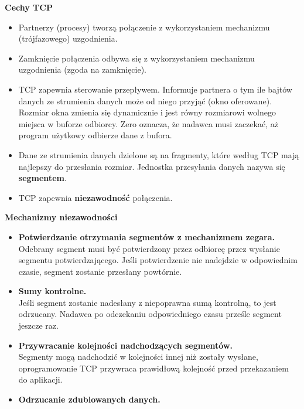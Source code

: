 \documentclass[../main.tex]{subfiles}
\begin{document}
    \textbf{Cechy TCP}
    \begin{itemize}
        \item Partnerzy (procesy) tworzą połączenie z wykorzystaniem mechanizmu (trójfazowego) uzgodnienia.
        \item Zamknięcie połączenia odbywa się z wykorzystaniem mechanizmu uzgodnienia (zgoda na zamknięcie).
        \item TCP zapewnia sterowanie przepływem. Informuje partnera o tym ile bajtów danych ze strumienia danych może od niego przyjąć (okno oferowane). Rozmiar okna zmienia się dynamicznie i jest równy rozmiarowi wolnego miejsca w buforze odbiorcy. Zero oznacza, że nadawca musi zaczekać, aż program użytkowy
        odbierze dane z bufora.
        \item Dane ze strumienia danych dzielone są na fragmenty, które według TCP mają najlepszy
        do przesłania rozmiar. Jednostka przesyłania danych nazywa się \textbf{segmentem}.
        \item TCP zapewnia \textbf{niezawodność} połączenia.
    \end{itemize}

    \textbf{Mechanizmy niezawodności}
    \begin{itemize}
        \item \textbf{Potwierdzanie otrzymania segmentów z mechanizmem zegara.}\\
        Odebrany segment musi być potwierdzony przez odbiorcę przez wysłanie segmentu potwierdzającego. Jeśli
        potwierdzenie nie nadejdzie w odpowiednim czasie, segment zostanie przesłany powtórnie.
        \item \textbf{Sumy kontrolne.}\\
        Jeśli segment zostanie nadesłany z niepoprawna sumą kontrolną, to jest
        odrzucany. Nadawca po odczekaniu odpowiedniego czasu prześle segment jeszcze raz.
        \item \textbf{Przywracanie kolejności nadchodzących segmentów.}\\
        Segmenty mogą nadchodzić w kolejności innej niż zostały wysłane, oprogramowanie TCP przywraca prawidłową kolejność przed przekazaniem do aplikacji.
        \item \textbf{Odrzucanie zdublowanych danych.}
    \end{itemize}
\end{document}
